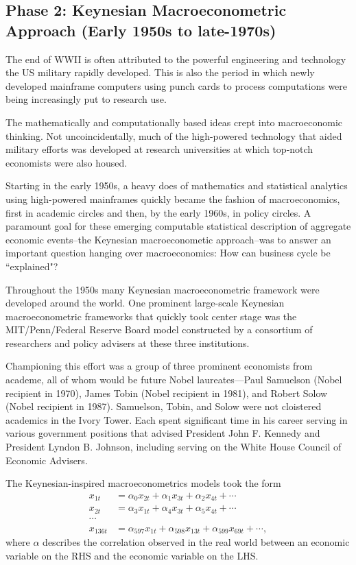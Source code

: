 \documentclass[10pt]{article}
\begin{document}
\subsection{Phase 2: Keynesian Macroeconometric Approach (Early 1950s to late-1970s)}
The end of WWII is often attributed to the powerful engineering and technology the US military
rapidly developed. This is also the period in which newly developed mainframe computers using punch
cards to process computations were being increasingly put to research use.

The mathematically and computationally based ideas crept into macroeconomic thinking. Not
uncoincidentally, much of the high-powered technology that aided military efforts was developed
at research universities at which top-notch economists were also housed.

Starting in the early 1950s, a heavy does of mathematics and statistical analytics using high-powered
mainframes quickly became the fashion of macroeconomics, first in academic circles and then,
by the early 1960s, in policy circles. A paramount goal for these emerging computable
statistical description of aggregate economic events--the Keynesian macroeconometic approach--was
to answer an important question hanging over macroeconomics: How can business cycle be 
``explained"?

Throughout the 1950s many Keynesian macroeconometric framework were developed around the world.
One prominent large-scale Keynesian macroeconometric frameworks that quickly took center stage
was the MIT/Penn/Federal Reserve Board model constructed by a consortium of researchers and policy
advisers at these three institutions.

Championing this effort was a group of three prominent economists from academe, all of whom would be future Nobel laureates—Paul Samuelson (Nobel recipient in 1970), James Tobin (Nobel recipient in 1981), and Robert Solow (Nobel recipient in 1987). Samuelson, Tobin, and Solow were not cloistered academics in the Ivory Tower. Each spent significant time in his career serving in various government positions that advised President John F. Kennedy and President Lyndon B. Johnson, including serving on the White House Council of Economic Advisers.

The Keynesian-inspired macroeconometrics models took the form
\begin{align*}
x_{1t}&= \alpha_0x_{2t} + \alpha_1x_{3t} + \alpha_2x_{4t} + \cdots\\
x_{2t}&= \alpha_3x_{1t} + \alpha_4x_{3t} + \alpha_5x_{4t} + \cdots\\
\cdots &\\
x_{136t}&= \alpha_{597}x_{1t} + \alpha_{598}x_{13t} + \alpha_{599}x_{69t} + \cdots,
\end{align*}
where $ \alpha $ describes the correlation observed in the real world between an economic 
variable on the RHS and the economic variable on the LHS.
\end{document}
